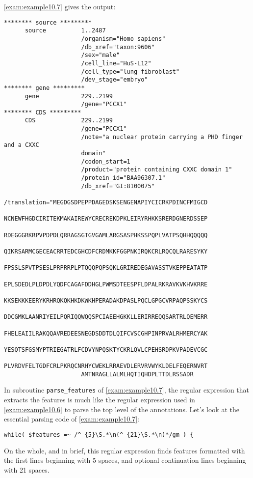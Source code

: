 \autoref{exam:example10.7} gives the output:

\begin{lstlisting}
******** source *********
      source          1..2487
                      /organism="Homo sapiens"
                      /db_xref="taxon:9606"
                      /sex="male"
                      /cell_line="HuS-L12"
                      /cell_type="lung fibroblast"
                      /dev_stage="embryo"
******** gene *********
      gene            229..2199
                      /gene="PCCX1"
******** CDS *********
      CDS             229..2199
                      /gene="PCCX1"
                      /note="a nuclear protein carrying a PHD finger and a CXXC
                      domain"
                      /codon_start=1
                      /product="protein containing CXXC domain 1"
                      /protein_id="BAA96307.1"
                      /db_xref="GI:8100075"
                      /translation="MEGDGSDPEPPDAGEDSKSENGENAPIYCICRKPDINCFMIGCD
                      NCNEWFHGDCIRITEKMAKAIREWYCRECREKDPKLEIRYRHKKSRERDGNERDSSEP
                      RDEGGGRKRPVPDPDLQRRAGSGTGVGAMLARGSASPHKSSPQPLVATPSQHHQQQQQ
                      QIKRSARMCGECEACRRTEDCGHCDFCRDMKKFGGPNKIRQKCRLRQCQLRARESYKY
                      FPSSLSPVTPSESLPRPRRPLPTQQQPQPSQKLGRIREDEGAVASSTVKEPPEATATP
                      EPLSDEDLPLDPDLYQDFCAGAFDDHGLPWMSDTEESPFLDPALRKRAVKVKHVKRRE
                      KKSEKKKEERYKRHRQKQKHKDKWKHPERADAKDPASLPQCLGPGCVRPAQPSSKYCS
                      DDCGMKLAANRIYEILPQRIQQWQQSPCIAEEHGKKLLERIRREQQSARTRLQEMERR
                      FHELEAIILRAKQQAVREDEESNEGDSDDTDLQIFCVSCGHPINPRVALRHMERCYAK
                      YESQTSFGSMYPTRIEGATRLFCDVYNPQSKTYCKRLQVLCPEHSRDPKVPADEVCGC
                      PLVRDVFELTGDFCRLPKRQCNRHYCWEKLRRAEVDLERVRVWYKLDELFEQERNVRT
                      AMTNRAGLLALMLHQTIQHDPLTTDLRSSADR
\end{lstlisting}

In subroutine \verb|parse_features| of \autoref{exam:example10.7}, the regular expression that extracts the features is much like the regular expression used in \autoref{exam:example10.6} to parse the top level of the annotations. Let's look at the essential parsing code of \autoref{exam:example10.7}: 

\begin{lstlisting}
while( $features =~ /^ {5}\S.*\n(^ {21}\S.*\n)*/gm ) {
\end{lstlisting}

On the whole, and in brief, this regular expression finds features formatted with the first lines beginning with 5 spaces, and optional continuation lines beginning with 21 spaces.

